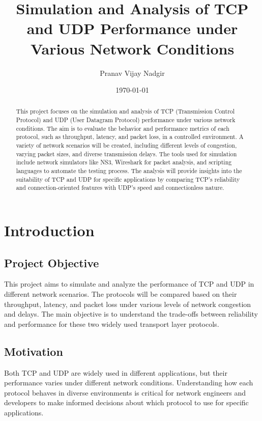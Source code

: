 \documentclass[a4paper,12pt]{article}
\title{Simulation and Analysis of TCP and UDP Performance under Various Network Conditions}
\author{Pranav Vijay Nadgir}
\date{\today}
\begin{document}
	
	\maketitle
	
	\begin{abstract}
		This project focuses on the simulation and analysis of TCP (Transmission Control Protocol) and UDP (User Datagram Protocol) performance under various network conditions. The aim is to evaluate the behavior and performance metrics of each protocol, such as throughput, latency, and packet loss, in a controlled environment. A variety of network scenarios will be created, including different levels of congestion, varying packet sizes, and diverse transmission delays. The tools used for simulation include network simulators like NS3, Wireshark for packet analysis, and scripting languages to automate the testing process. The analysis will provide insights into the suitability of TCP and UDP for specific applications by comparing TCP's reliability and connection-oriented features with UDP's speed and connectionless nature. 
	\end{abstract}
	
	\tableofcontents
	
	\section{Introduction}
	\subsection{Project Objective}
	This project aims to simulate and analyze the performance of TCP and UDP in different network scenarios. The protocols will be compared based on their throughput, latency, and packet loss under various levels of network congestion and delays. The main objective is to understand the trade-offs between reliability and performance for these two widely used transport layer protocols.
	
	\subsection{Motivation}
	Both TCP and UDP are widely used in different applications, but their performance varies under different network conditions. Understanding how each protocol behaves in diverse environments is critical for network engineers and developers to make informed decisions about which protocol to use for specific applications.
	
\end{document}

